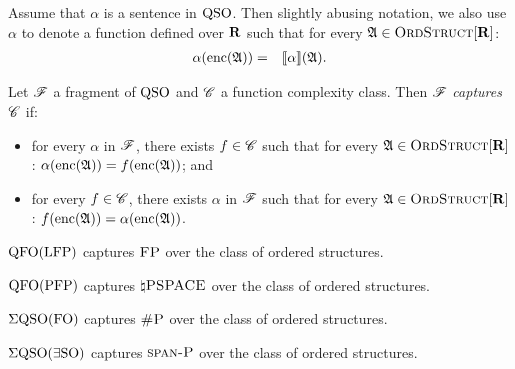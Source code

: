 

Assume that $\alpha$ is a sentence in ${\rm QSO}$. Then slightly abusing notation, we also use $\alpha$ to denote a function defined over $\mathbf{R}$  such that for every $\mathfrak{A} \in \text{\sc OrdStruct}[\mathbf{R}] $:
\begin{eqnarray*}
	\alpha({\rm enc}(\mathfrak{A})) & = & {\llbracket{}{\alpha}\rrbracket}(\mathfrak{A}).
\end{eqnarray*}
\begin{definition}
	Let $\mathscr{F}$ a fragment of ${\rm QSO}$ and $\mathscr{C}$ a function complexity class. Then $\mathscr{F}$ {\em captures} $\mathscr{C}$ if:
	\begin{itemize}
		\item for every $\alpha$ in $\mathscr{F}$, there exists $f \in \mathscr{C}$ such that for every 
		$\mathfrak{A} \in \text{\sc OrdStruct}[\mathbf{R}]$:  $\alpha({\rm enc}(\mathfrak{A})) = f({\rm enc}(\mathfrak{A}))$; and
		
		\item for every $f \in \mathscr{C}$, there exists $\alpha$ in $\mathscr{F}$ such that for every 
		$\mathfrak{A} \in \text{\sc OrdStruct}[\mathbf{R}]$:  $f({\rm enc}(\mathfrak{A})) = \alpha({\rm enc}(\mathfrak{A}))$.
	\end{itemize}
\end{definition}


\begin{theorem} \label{captfp}
	${\rm QFO}({\rm LFP})$ captures $\text{\sc FP}$ over the class of ordered structures.
\end{theorem}


\begin{theorem} \label{qfo-pfp-cap}
	${\rm QFO}({\rm PFP})$ captures $\natural\text{\sc PSPACE}$ over the class of ordered structures.
\end{theorem}

\begin{theorem} \label{eqso-fo-cap}
	$\Sigma{\rm QSO}({\rm FO})$ captures $\text{\sc \#P}$ over the class of ordered structures.
\end{theorem}

\begin{theorem} \label{eqso-eso-cap}
	$\Sigma{\rm QSO}(\exists{\rm SO})$ captures $\text{\sc span-P}$ over the class of ordered structures.
\end{theorem}

